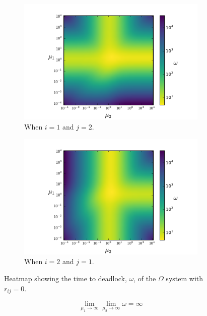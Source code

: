 \documentclass{article}
\begin{document}
\begin{figure}[htbp!]
	\begin{center}
	  \begin{subfigure}{0.45\textwidth}
		\includegraphics[width=\textwidth]{images/r11r21r22.pdf}
		\caption{When $i = 1$ and $j = 2$.}
	  \end{subfigure}
	  \begin{subfigure}{0.45\textwidth}
		\includegraphics[width=\textwidth]{images/r11r12r22.pdf}
		\caption{When $i = 2$ and $j = 1$.}
	  \end{subfigure}
	\end{center}
	\caption{Heatmap showing the time to deadlock, $\omega$, of the $\Omega$ system with $r_{ij} = 0$.}
	\label{fig:riirjirjj}
\end{figure}

\begin{equation}\label{eqn:r12_infinf}
\lim_{\mu_1 \to \infty} \lim_{\mu_2 \to \infty} \omega = \infty
\end{equation}
\end{document}

